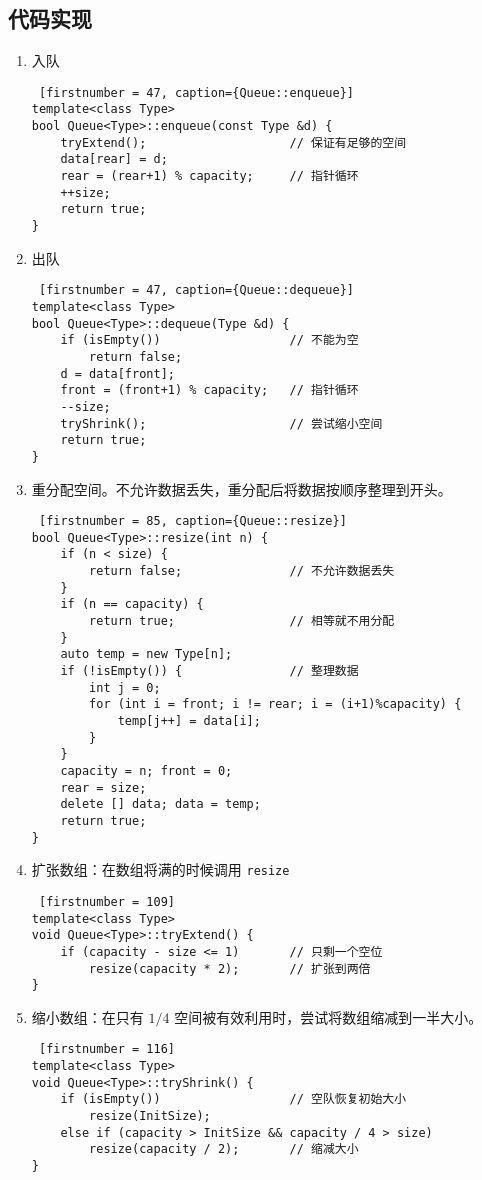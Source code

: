 \subsection{代码实现}

{
\begin{enumerate}
      \item 入队
\begin{lstlisting} [firstnumber = 47, caption={Queue::enqueue}]
template<class Type>
bool Queue<Type>::enqueue(const Type &d) {
    tryExtend();                    // 保证有足够的空间
    data[rear] = d;
    rear = (rear+1) % capacity;     // 指针循环
    ++size;
    return true;
} \end{lstlisting}
      \item 出队
\begin{lstlisting} [firstnumber = 47, caption={Queue::dequeue}]
template<class Type>
bool Queue<Type>::dequeue(Type &d) {
    if (isEmpty())                  // 不能为空
        return false;
    d = data[front];
    front = (front+1) % capacity;   // 指针循环
    --size;
    tryShrink();                    // 尝试缩小空间
    return true;
}\end{lstlisting}
      \item 重分配空间。不允许数据丢失，重分配后将数据按顺序整理到开头。
\begin{lstlisting} [firstnumber = 85, caption={Queue::resize}]     
bool Queue<Type>::resize(int n) {
    if (n < size) {
        return false;               // 不允许数据丢失
    }
    if (n == capacity) {
        return true;                // 相等就不用分配
    }
    auto temp = new Type[n];        
    if (!isEmpty()) {               // 整理数据
        int j = 0;
        for (int i = front; i != rear; i = (i+1)%capacity) {
            temp[j++] = data[i];
        }
    }
    capacity = n; front = 0;
    rear = size;
    delete [] data; data = temp;
    return true;
} \end{lstlisting}
      \item 扩张数组：在数组将满的时候调用 \lstinline{resize}
\begin{lstlisting} [firstnumber = 109]
template<class Type>
void Queue<Type>::tryExtend() {
    if (capacity - size <= 1)       // 只剩一个空位
        resize(capacity * 2);       // 扩张到两倍
} \end{lstlisting}
      \item 缩小数组：在只有 $1/4$ 空间被有效利用时，尝试将数组缩减到一半大小。
\begin{lstlisting} [firstnumber = 116]
template<class Type>
void Queue<Type>::tryShrink() {
    if (isEmpty())                  // 空队恢复初始大小
        resize(InitSize);           
    else if (capacity > InitSize && capacity / 4 > size)
        resize(capacity / 2);       // 缩减大小
}
\end{lstlisting}
\end{enumerate}
}

